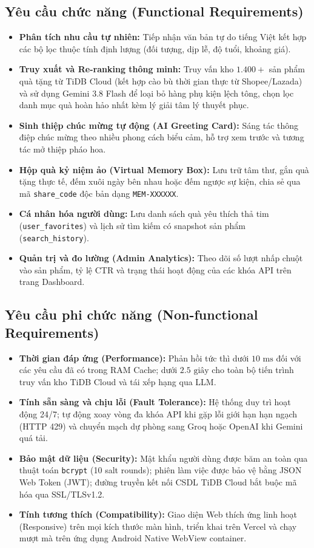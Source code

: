 \subsection{Yêu cầu chức năng (Functional Requirements)}
\begin{itemize}[leftmargin=1.2cm, itemsep=2pt]
    \item \textbf{Phân tích nhu cầu tự nhiên:} Tiếp nhận văn bản tự do tiếng Việt kết hợp các bộ lọc thuộc tính định lượng (đối tượng, dịp lễ, độ tuổi, khoảng giá).
    \item \textbf{Truy xuất và Re-ranking thông minh:} Truy vấn kho $1.400+$ sản phẩm quà tặng từ TiDB Cloud (kết hợp cào bù thời gian thực từ Shopee/Lazada) và sử dụng Gemini 3.8 Flash để loại bỏ hàng phụ kiện lệch tông, chọn lọc danh mục quà hoàn hảo nhất kèm lý giải tâm lý thuyết phục.
    \item \textbf{Sinh thiệp chúc mừng tự động (AI Greeting Card):} Sáng tác thông điệp chúc mừng theo nhiều phong cách biểu cảm, hỗ trợ xem trước và tương tác mở thiệp pháo hoa.
    \item \textbf{Hộp quà kỷ niệm ảo (Virtual Memory Box):} Lưu trữ tâm thư, gắn quà tặng thực tế, đếm xuôi ngày bên nhau hoặc đếm ngược sự kiện, chia sẻ qua mã \texttt{share\_code} độc bản dạng \texttt{MEM-XXXXXX}.
    \item \textbf{Cá nhân hóa người dùng:} Lưu danh sách quà yêu thích thả tim (\texttt{user\_favorites}) và lịch sử tìm kiếm có snapshot sản phẩm (\texttt{search\_history}).
    \item \textbf{Quản trị và đo lường (Admin Analytics):} Theo dõi số lượt nhấp chuột vào sản phẩm, tỷ lệ CTR và trạng thái hoạt động của các khóa API trên trang Dashboard.
\end{itemize}

\subsection{Yêu cầu phi chức năng (Non-functional Requirements)}
\begin{itemize}[leftmargin=1.2cm, itemsep=2pt]
    \item \textbf{Thời gian đáp ứng (Performance):} Phản hồi tức thì dưới $10\text{ ms}$ đối với các yêu cầu đã có trong RAM Cache; dưới $2.5\text{ giây}$ cho toàn bộ tiến trình truy vấn kho TiDB Cloud và tái xếp hạng qua LLM.
    \item \textbf{Tính sẵn sàng và chịu lỗi (Fault Tolerance):} Hệ thống duy trì hoạt động 24/7; tự động xoay vòng đa khóa API khi gặp lỗi giới hạn hạn ngạch (HTTP 429) và chuyển mạch dự phòng sang Groq hoặc OpenAI khi Gemini quá tải.
    \item \textbf{Bảo mật dữ liệu (Security):} Mật khẩu người dùng được băm an toàn qua thuật toán \texttt{bcrypt} (10 salt rounds); phiên làm việc được bảo vệ bằng JSON Web Token (JWT); đường truyền kết nối CSDL TiDB Cloud bắt buộc mã hóa qua SSL/TLSv1.2.
    \item \textbf{Tính tương thích (Compatibility):} Giao diện Web thích ứng linh hoạt (Responsive) trên mọi kích thước màn hình, triển khai trên Vercel và chạy mượt mà trên ứng dụng Android Native WebView container.
\end{itemize}

